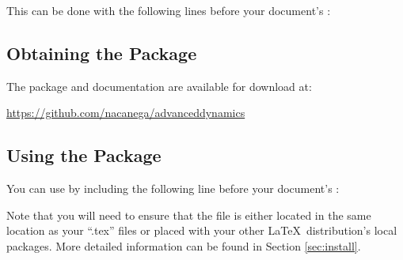 This can be done with the following lines before your document's :
\begin{indentList}
	\item {}
	\item {}
    \item {}
	\item {}
	\item {}
	\item {}
\end{indentList}

\subsection{Obtaining the Package}
\label{sec:download}
The  package and documentation are available for download at:
\begin{indentList}
	\item \url{https://github.com/nacanega/advanceddynamics}
\end{indentList}

\subsection{Using the Package}
\label{sec:usage}
You can use  by including the following line before your document's :
\begin{indentList}
	\item {}
\end{indentList}

Note that you will need to ensure that the file  is either located in the same location as your ``.tex'' files or placed with your other \LaTeX\ distribution's local packages. More detailed information can be found in Section \ref{sec:install}.